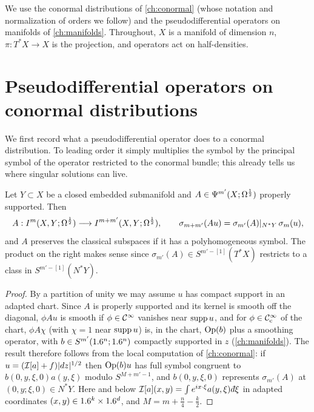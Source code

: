 We use the conormal distributions of \cref{ch:conormal} (whose notation and
normalization of orders we follow) and the pseudodifferential operators on
manifolds of \cref{ch:manifolds}.  Throughout, $X$ is a manifold of dimension
$n$, $\pi:T^*X\to X$ is the projection, and operators act on half-densities.

\section{Pseudodifferential operators on conormal distributions}\label{hj:sec:psido}

We first record what a pseudodifferential operator does to a conormal distribution.
To leading order it simply multiplies the symbol by the principal symbol of the
operator restricted to the conormal bundle; this already tells us where singular
solutions can live.

\begin{theorem}\label{hj:thm:psido-conormal}
  Let $Y\subset X$ be a closed embedded submanifold and
  $A\in\Psi^{m'}(X;\Omega^{\frac12})$ properly supported.  Then
  \begin{equation*}
    A:I^{m}(X,Y;\Omega^{\frac12})\longrightarrow I^{m+m'}(X,Y;\Omega^{\frac12}),\qquad
    \sigma_{m+m'}(Au)=\sigma_{m'}(A)|_{N^*Y}\,\sigma_m(u),
  \end{equation*}
  and $A$ preserves the classical subspaces if it has a polyhomogeneous symbol.
  The product on the right makes sense since $\sigma_{m'}(A)\in
  S^{m'-[1]}(T^*X)$ restricts to a class in $S^{m'-[1]}(N^*Y)$.
\end{theorem}
\begin{proof}
  By a partition of unity we may assume $u$ has compact support in an adapted
  chart.  Since $A$ is properly supported and its kernel is smooth off the
  diagonal, $\phi Au$ is smooth if $\phi\in\mathcal{C}^\infty$ vanishes near $\operatorname{supp} u$, and for
  $\phi\in\mathcal{C}^\infty_{\mathrm{c}}$ of the chart, $\phi A\chi$ (with $\chi=1$ near $\operatorname{supp} u$) is, in
  the chart, $\operatorname{Op}(b)$ plus a smoothing operator, with $b\in S^{m'}(1.6^n;1.6^n)$
  compactly supported in $z$ (\cref{ch:manifolds}).  The result therefore follows
  from the local computation of \cref{ch:conormal}: if $u=(\mathcal{I}[a]+f)|dz|^{1/2}$
  then $\operatorname{Op}(b)u$ has full symbol congruent to $b(0,y,\xi,0)a(y,\xi)$ modulo
  $S^{M+m'-1}$, and $b(0,y,\xi,0)$ represents $\sigma_{m'}(A)$ at
  $(0,y;\xi,0)\in N^*Y$.  Here and below $\osc{a}(x,y)=\int e^{ix\cdot\xi}
  a(y,\xi)\,\dbar\xi$ in adapted coordinates $(x,y)\in1.6^k\times1.6^d$, and
  $M=m+\frac n4-\frac k2$.
\end{proof}

